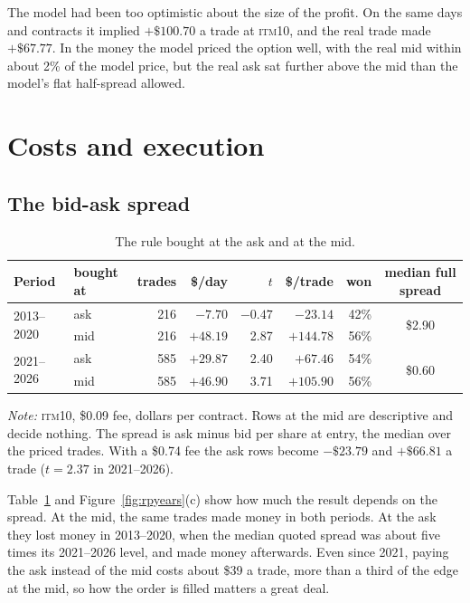 \documentclass[12pt,letterpaper]{article}
\newcommand{\tabnotes}[1]{\par\vspace{5pt}\parbox{\linewidth}{\footnotesize\setlength{\parindent}{0pt}\textit{Note:} #1}\par}
\newcommand{\ITM}[1]{\textsc{itm}#1}
\newcommand{\dollar}{\$}
\begin{document}
The model had been too optimistic about the size of the profit. On the same
days and contracts it implied $+\$100.70$ a trade at \ITM{10}, and the real
trade made $+\$67.77$. In the money the model
priced the option well, with the real mid within about 2\% of the model price,
but the real ask sat further above the mid than the model's flat half-spread
allowed.

\section{Costs and execution}
\label{sec:costs}



\subsection{The bid-ask spread}
\label{sec:spread}

\begin{table}[htbp]
\centering
\caption{The rule bought at the ask and at the mid.}
\label{tab:spread}
\begin{tabular}{llrrrrrc}
\toprule
Period & bought at & trades & \$/day & $t$ & \$/trade & won & median full spread \\
\midrule
\multirow{2}{*}{2013--2020} & ask & 216 & $-7.70$ & $-0.47$ & $-23.14$ & 42\% & \multirow{2}{*}{\dollar2.90} \\
 & mid & 216 & $+48.19$ & 2.87 & $+144.78$ & 56\% & \\
\midrule
\multirow{2}{*}{2021--2026} & ask & 585 & $+29.87$ & 2.40 & $+67.46$ & 54\% & \multirow{2}{*}{\dollar0.60} \\
 & mid & 585 & $+46.90$ & 3.71 & $+105.90$ & 56\% & \\
\bottomrule
\end{tabular}
\tabnotes{\ITM{10}, \$0.09 fee, dollars per contract. Rows at the mid are
descriptive and decide nothing. The spread is ask minus bid per share at entry,
the median over the priced trades. With a \$0.74 fee the ask rows become
$-\$23.79$ and $+\$66.81$ a trade ($t = 2.37$ in 2021--2026).}
\end{table}

Table~\ref{tab:spread} and Figure~\ref{fig:rpyears}(c) show how much the result depends on the spread. At the mid, the same trades made money in both periods. At the ask they
lost money in 2013--2020, when the median quoted spread was about five times its
2021--2026 level, and made money afterwards. Even since 2021, paying the ask instead of the mid costs about \$39 a trade,
more than a third of the edge at the mid, so how the order is filled matters a
great deal.
\end{document}
